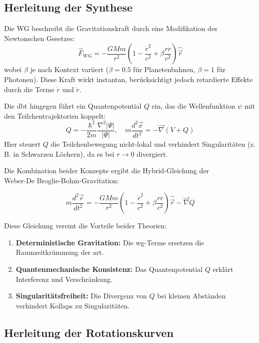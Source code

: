 \subsection{Herleitung der Synthese}
Die WG beschreibt die Gravitationskraft durch eine Modifikation des Newtonschen Gesetzes:
\begin{equation}
    \label{eq:wg-dbt}
    \vec{F}_{\text{WG}} = -\frac{GMm}{r^2}\left(1 - \frac{\dot{r}^2}{c^2} + \beta \frac{r\ddot{r}}{c^2}\right)\hat{\vec{r}}
\end{equation}
wobei $\beta$ je nach Kontext variiert ($\beta=0.5$ für Planetenbahnen, $\beta=1$ für Photonen). Diese Kraft wirkt instantan, berücksichtigt jedoch retardierte Effekte durch die
Terme $\dot{r}$ und $\ddot{r}$.

Die \gls{dbt} hingegen führt ein Quantenpotential $Q$ ein, das die Wellenfunktion $\psi$ mit den Teilchentrajektorien koppelt:
\begin{equation}
    Q = -\frac{\hbar^2}{2m}\frac{\nabla^2 |\Psi|}{|\Psi|}, \quad m\frac{d^2\vec{x}}{dt^2} = -\vec{\nabla}(V + Q)
\end{equation}
Hier steuert $Q$ die Teilchenbewegung nicht-lokal und verhindert Singularitäten (z. B. in Schwarzen Löchern), da es bei $r \to 0$ divergiert.

Die Kombination beider Konzepte ergibt die Hybrid-Gleichung der\\Weber-De Broglie-Bohm-Gravitation:

\begin{equation}
    m\frac{d^2\vec{r}}{dt^2} = -\frac{GMm}{r^2}\left(1 - \frac{\dot{r}^2}{c^2} + \beta \frac{r\ddot{r}}{c^2}\right)\hat{{\vec{r}}} - \vec{\nabla} Q
\end{equation}

Diese Gleichung vereint die Vorteile beider Theorien:
\begin{enumerate}
    \item \textbf{Deterministische Gravitation:} Die \gls{wg}-Terme ersetzen die Raumzeitkrümmung der \gls{art}.
    \item \textbf{Quantenmechanische Konsistenz:} Das Quantenpotential $Q$ erklärt Interferenz und Verschränkung.
    \item \textbf{Singularitätsfreiheit:} Die Divergenz von $Q$ bei kleinen Abständen verhindert Kollaps zu Singularitäten.
\end{enumerate}

\newpage
\subsection{Herleitung der Rotationskurven}

